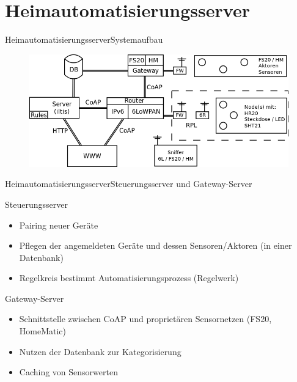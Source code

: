 \section{Heimautomatisierungsserver}

\begin{frame}{Heimautomatisierungsserver}{Systemaufbau}
	\begin{figure}
	\centering
	\includegraphics[width=\linewidth]{Systemaufbau}
	\end{figure}
\end{frame}

\begin{frame}{Heimautomatisierungsserver}{Steuerungsserver und Gateway-Server}
	\begin{block}{Steuerungsserver}
		\begin{itemize}
		\item 	Pairing neuer Geräte
		\item 	Pflegen der angemeldeten Geräte und dessen Sensoren/Aktoren
				(in einer Datenbank)
		\item 	Regelkreis bestimmt Automatisierungsprozess (Regelwerk)
		\end{itemize}
	\end{block}
	\begin{block}{Gateway-Server}
		\begin{itemize}
		\item 	Schnittstelle zwischen CoAP und proprietären Sensornetzen
				\eg(FS20, HomeMatic)
		\item 	Nutzen der Datenbank zur Kategorisierung
		\item 	Caching von Sensorwerten
		\end{itemize}
	\end{block}
\end{frame}


